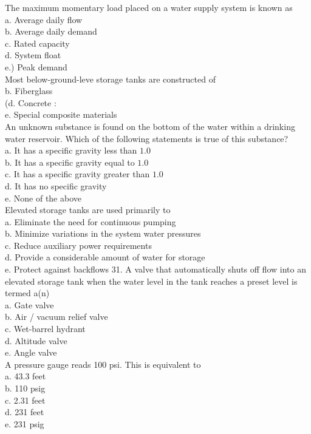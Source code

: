 The maximum momentary load placed on a water supply system is known as\\
a. Average daily flow\\
b. Average daily demand\\
c. Rated capacity\\
d. System float\\
e.) Peak demand\\

Most below-ground-leve storage tanks are constructed of\\
b. Fiberglass\\
(d. Concrete :\\
e. Special composite materials\\

An unknown substance is found on the bottom of the water within a drinking water reservoir. Which of the following statements is true of this substance?\\
a. It has a specific gravity less than $1.0$\\
b. It has a specific gravity equal to $1.0$\\
c. It has a specific gravity greater than $1.0$\\
d. It has no specific gravity\\
e. None of the above\\

Elevated storage tanks are used primarily to\\
a. Eliminate the need for continuous pumping\\
b. Minimize variations in the system water pressures\\
c. Reduce auxiliary power requirements\\
d. Provide a considerable amount of water for storage\\
e. Protect against backflows 31. A valve that automatically shuts off flow into an elevated storage tank when the water level in the tank reaches a preset level is termed a(n)\\
a. Gate valve\\
b. Air / vacuum relief valve\\
c. Wet-barrel hydrant\\
d.  Altitude valve\\
e. Angle valve\\


A pressure gauge reads 100 psi. This is equivalent to\\
a. 43.3 feet\\
b. 110 psig\\
c. 2.31 feet\\
d. 231 feet\\
e. 231 psig\\

